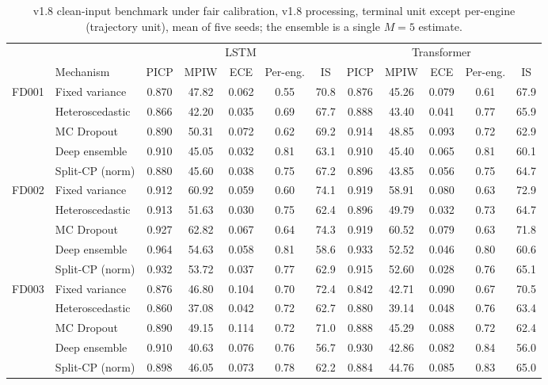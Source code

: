 \documentclass[10pt,a4paper]{article}
\begin{document}
\begin{table}[H]\centering\scriptsize
\caption{v1.8 clean-input benchmark under fair calibration, v1.8 processing, terminal unit except per-engine (trajectory unit), mean of five seeds; the ensemble is a single $M=5$ estimate.}
\begin{tabular}{llccccc|ccccc}\toprule
 & & \multicolumn{5}{c|}{LSTM} & \multicolumn{5}{c}{Transformer} \\
 & Mechanism & PICP & MPIW & ECE & Per-eng. & IS & PICP & MPIW & ECE & Per-eng. & IS \\ \midrule
\multirow{5}{*}{FD001} & Fixed variance & 0.870 & 47.82 & 0.062 & 0.55 & 70.8 & 0.876 & 45.26 & 0.079 & 0.61 & 67.9 \\
 & Heteroscedastic & 0.866 & 42.20 & 0.035 & 0.69 & 67.7 & 0.888 & 43.40 & 0.041 & 0.77 & 65.9 \\
 & MC Dropout & 0.890 & 50.31 & 0.072 & 0.62 & 69.2 & 0.914 & 48.85 & 0.093 & 0.72 & 62.9 \\
 & Deep ensemble & 0.910 & 45.05 & 0.032 & 0.81 & 63.1 & 0.910 & 45.40 & 0.065 & 0.81 & 60.1 \\
 & Split-CP (norm) & 0.880 & 45.60 & 0.038 & 0.75 & 67.2 & 0.896 & 43.85 & 0.056 & 0.75 & 64.7 \\
\midrule
\multirow{5}{*}{FD002} & Fixed variance & 0.912 & 60.92 & 0.059 & 0.60 & 74.1 & 0.919 & 58.91 & 0.080 & 0.63 & 72.9 \\
 & Heteroscedastic & 0.913 & 51.63 & 0.030 & 0.75 & 62.4 & 0.896 & 49.79 & 0.032 & 0.73 & 64.7 \\
 & MC Dropout & 0.927 & 62.82 & 0.067 & 0.64 & 74.3 & 0.919 & 60.52 & 0.079 & 0.63 & 71.8 \\
 & Deep ensemble & 0.964 & 54.63 & 0.058 & 0.81 & 58.6 & 0.933 & 52.52 & 0.046 & 0.80 & 60.6 \\
 & Split-CP (norm) & 0.932 & 53.72 & 0.037 & 0.77 & 62.9 & 0.915 & 52.60 & 0.028 & 0.76 & 65.1 \\
\midrule
\multirow{5}{*}{FD003} & Fixed variance & 0.876 & 46.80 & 0.104 & 0.70 & 72.4 & 0.842 & 42.71 & 0.090 & 0.67 & 70.5 \\
 & Heteroscedastic & 0.860 & 37.08 & 0.042 & 0.72 & 62.7 & 0.880 & 39.14 & 0.048 & 0.76 & 63.4 \\
 & MC Dropout & 0.890 & 49.15 & 0.114 & 0.72 & 71.0 & 0.888 & 45.29 & 0.088 & 0.72 & 62.4 \\
 & Deep ensemble & 0.910 & 40.63 & 0.076 & 0.76 & 56.7 & 0.930 & 42.86 & 0.082 & 0.84 & 56.0 \\
 & Split-CP (norm) & 0.898 & 46.05 & 0.073 & 0.78 & 62.2 & 0.884 & 44.76 & 0.085 & 0.83 & 65.0 \\

\end{tabular}
\end{table}
\end{document}
